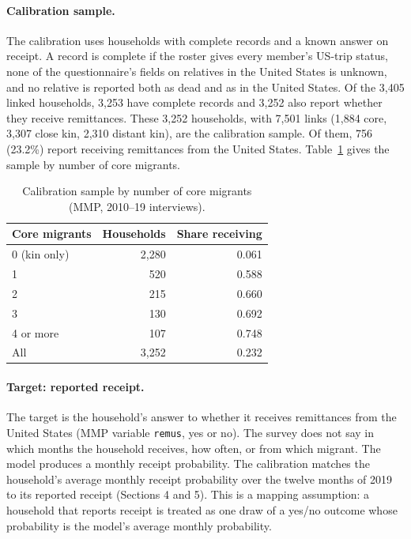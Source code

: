 \documentclass[11pt]{article}
\begin{document}
\paragraph{Calibration sample.} The calibration uses households with complete records and a known answer on receipt. A record is complete if the roster gives every member's US-trip status, none of the questionnaire's fields on relatives in the United States is unknown, and no relative is reported both as dead and as in the United States. Of the 3,405 linked households, 3,253 have complete records and 3,252 also report whether they receive remittances. These 3,252 households, with 7,501 links (1,884 core, 3,307 close kin, 2,310 distant kin), are the calibration sample. Of them, 756 (23.2\%) report receiving remittances from the United States. Table~\ref{tab:sample} gives the sample by number of core migrants.

\begin{table}[ht]
\centering
\caption{Calibration sample by number of core migrants (MMP, 2010--19 interviews).}
\label{tab:sample}
\begin{tabular}{lrr}
\toprule
Core migrants & Households & Share receiving \\
\midrule
0 (kin only) & 2,280 & 0.061 \\
1 & 520 & 0.588 \\
2 & 215 & 0.660 \\
3 & 130 & 0.692 \\
4 or more & 107 & 0.748 \\
\midrule
All & 3,252 & 0.232 \\
\bottomrule
\end{tabular}
\end{table}

\paragraph{Target: reported receipt.} The target is the household's answer to whether it receives remittances from the United States (MMP variable \texttt{remus}, yes or no). The survey does not say in which months the household receives, how often, or from which migrant. The model produces a monthly receipt probability. The calibration matches the household's average monthly receipt probability over the twelve months of 2019 to its reported receipt (Sections 4 and 5). This is a mapping assumption: a household that reports receipt is treated as one draw of a yes/no outcome whose probability is the model's average monthly probability.
\end{document}
